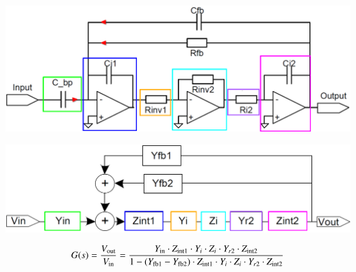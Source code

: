 \begin{minipage}[c]{0.48\columnwidth}
    \includegraphics[width=\columnwidth]{images/signalflussdiagramme_bandpass_schaltung.png}
\end{minipage}
\hfill
\begin{minipage}[c]{0.48\columnwidth}
    \includegraphics[width=\columnwidth]{images/signalflussdiagramme_bandpass_blockschaltbild.png}
\end{minipage}

$$ G(s) = \frac{V_{\rm out}}{V_{\rm in}} = \frac{Y_{\rm in} \cdot Z_{\rm int1} \cdot Y_i \cdot Z_i \cdot Y_{r2} \cdot Z_{\rm int2} }
    {1 - (Y_{\rm fb1} - Y_{\rm fb2}) \cdot Z_{\rm int1} \cdot Y_i \cdot Z_i \cdot Y_{r2} \cdot Z_{\rm int2} } $$
